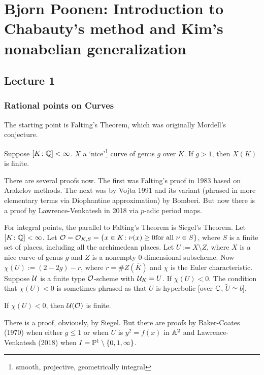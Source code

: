 \newpage
\section{Bjorn Poonen: Introduction to Chabauty's method and Kim's nonabelian generalization}
\subsection{Lecture 1}
\subsubsection{Rational points on Curves}

The starting point is Falting's Theorem, which was originally Mordell's conjecture.

\begin{thm}[Falting's, 1983]
Suppose $[K \colon \Q] < \infty$.
$X$ a `nice'\footnote{smooth, projective, geometrically integral} curve of genus $g$ over $K$. If $g>1$, then $X(K)$ is finite. 
\end{thm}


There are several proofs now. The first was Falting's proof in 1983 based on Arakelov methods. The next was by Vojta 1991 and its variant (phrased in more elementary terms via Diophantine approximation) by Bomberi. But now there is a proof by Lawrence-Venkatesh in 2018 via $p$-adic period maps. 


For integral points, the parallel to Falting's Theorem is Siegel's Theorem. Let $[K \colon \Q] < \infty$. Let $\O= \O_{K,S}= \{ x \in K \colon \nu(x) \geq 0 \text{for all } \nu \in S \}$, where $S$ is a finite set of places, including all the archimedean places. Let $U:= X \setminus Z$, where $X$ is a nice curve of genus $g$ and $Z$ is a nonempty 0-dimensional subscheme. Now $\chi(U):= (2-2g) - r$, where $r= \#Z(\overline{K})$ and $\chi$ is the Euler characteristic. Suppose $\cU$ is a finite type $\O$-scheme with $\cU_K= U$. If $\chi(U)< 0$. The condition that $\chi(U)<0$ is sometimes phrased as that $U$ is hyperbolic [over $\C$, $\widetilde{U} \simeq b$]. 


\begin{thm}
If $\chi(U)< 0$, then $\cU(\O)$ is finite. 
\end{thm}


There is a proof, obviously, by Siegel. But there are proofs by Baker-Coates (1970) when either $g \leq 1$ or when $U$ is $y^2= f(x)$ in $\A^2$ and Lawrence-Venkatesh (2018) when $I= \P^1 \setminus \{0,1,\infty\}$. 


